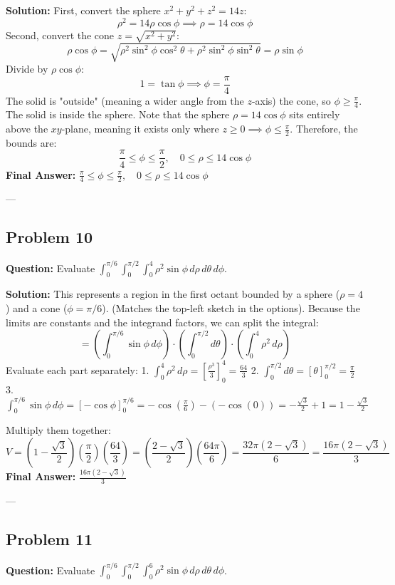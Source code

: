 \documentclass[12pt]{article}
\begin{document}
\textbf{Solution:}
First, convert the sphere $x^2+y^2+z^2 = 14z$:
\[ \rho^2 = 14\rho\cos\phi \implies \rho = 14\cos\phi \]
Second, convert the cone $z = \sqrt{x^2+y^2}$:
\[ \rho\cos\phi = \sqrt{\rho^2 \sin^2\phi \cos^2\theta + \rho^2 \sin^2\phi \sin^2\theta} = \rho\sin\phi \]
Divide by $\rho\cos\phi$:
\[ 1 = \tan\phi \implies \phi = \frac{\pi}{4} \]
The solid is "outside" (meaning a wider angle from the $z$-axis) the cone, so $\phi \ge \frac{\pi}{4}$.
The solid is inside the sphere. Note that the sphere $\rho = 14\cos\phi$ sits entirely above the $xy$-plane, meaning it exists only where $z \ge 0 \implies \phi \le \frac{\pi}{2}$.
Therefore, the bounds are:
\[ \frac{\pi}{4} \le \phi \le \frac{\pi}{2}, \quad 0 \le \rho \le 14\cos\phi \]
\textbf{Final Answer:} $\frac{\pi}{4} \le \phi \le \frac{\pi}{2}, \quad 0 \le \rho \le 14\cos\phi$

---

\subsection*{Problem 10}
\textbf{Question:} Evaluate $\int_0^{\pi/6} \int_0^{\pi/2} \int_0^4 \rho^2 \sin\phi \, d\rho \, d\theta \, d\phi$.

\textbf{Solution:}
This represents a region in the first octant bounded by a sphere ($\rho=4$) and a cone ($\phi=\pi/6$). (Matches the top-left sketch in the options).
Because the limits are constants and the integrand factors, we can split the integral:
\[ = \left( \int_0^{\pi/6} \sin\phi \, d\phi \right) \cdot \left( \int_0^{\pi/2} d\theta \right) \cdot \left( \int_0^4 \rho^2 \, d\rho \right) \]
Evaluate each part separately:
1. $\int_0^4 \rho^2 \, d\rho = \left[ \frac{\rho^3}{3} \right]_0^4 = \frac{64}{3}$
2. $\int_0^{\pi/2} d\theta = \left[ \theta \right]_0^{\pi/2} = \frac{\pi}{2}$
3. $\int_0^{\pi/6} \sin\phi \, d\phi = \left[ -\cos\phi \right]_0^{\pi/6} = -\cos\left(\frac{\pi}{6}\right) - (-\cos(0)) = -\frac{\sqrt{3}}{2} + 1 = 1 - \frac{\sqrt{3}}{2}$

Multiply them together:
\[ V = \left( 1 - \frac{\sqrt{3}}{2} \right) \left( \frac{\pi}{2} \right) \left( \frac{64}{3} \right) = \left( \frac{2-\sqrt{3}}{2} \right) \left( \frac{64\pi}{6} \right) = \frac{32\pi(2-\sqrt{3})}{6} = \frac{16\pi(2-\sqrt{3})}{3} \]
\textbf{Final Answer:} $\frac{16\pi(2-\sqrt{3})}{3}$

---

\subsection*{Problem 11}
\textbf{Question:} Evaluate $\int_0^{\pi/6} \int_0^{\pi/2} \int_0^6 \rho^2 \sin\phi \, d\rho \, d\theta \, d\phi$.
\end{document}
